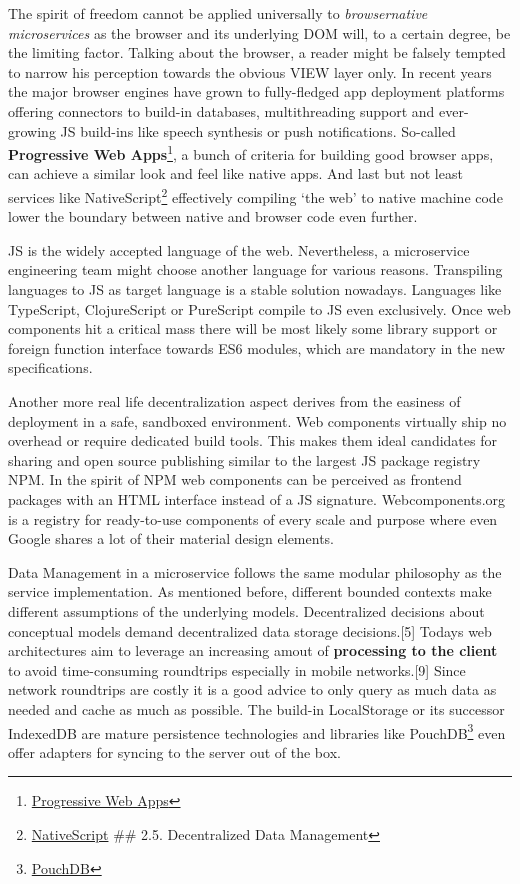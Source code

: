 \documentclass[]{article}
\begin{document}
The spirit of freedom cannot be applied universally to
\emph{browsernative microservices} as the browser and its underlying DOM
will, to a certain degree, be the limiting factor. Talking about the
browser, a reader might be falsely tempted to narrow his perception
towards the obvious VIEW layer only. In recent years the major browser
engines have grown to fully-fledged app deployment platforms offering
connectors to build-in databases, multithreading support and
ever-growing JS build-ins like speech synthesis or push notifications.
So-called \textbf{Progressive Web Apps}\footnote{\href{https://developers.google.com/web/progressive-web-apps}{Progressive
  Web Apps}}, a bunch of criteria for building good browser apps, can
achieve a similar look and feel like native apps. And last but not least
services like NativeScript\footnote{\href{https://www.nativescript.org}{NativeScript}
  \#\# 2.5. Decentralized Data Management} effectively compiling `the
web' to native machine code lower the boundary between native and
browser code even further.

JS is the widely accepted language of the web. Nevertheless, a
microservice engineering team might choose another language for various
reasons. Transpiling languages to JS as target language is a stable
solution nowadays. Languages like TypeScript, ClojureScript or
PureScript compile to JS even exclusively. Once web components hit a
critical mass there will be most likely some library support or foreign
function interface towards ES6 modules, which are mandatory in the new
specifications.

Another more real life decentralization aspect derives from the easiness
of deployment in a safe, sandboxed environment. Web components virtually
ship no overhead or require dedicated build tools. This makes them ideal
candidates for sharing and open source publishing similar to the largest
JS package registry NPM. In the spirit of NPM web components can be
perceived as frontend packages with an HTML interface instead of a JS
signature. Webcomponents.org is a registry for ready-to-use components
of every scale and purpose where even Google shares a lot of their
material design elements.

Data Management in a microservice follows the same modular philosophy as
the service implementation. As mentioned before, different bounded
contexts make different assumptions of the underlying models.
Decentralized decisions about conceptual models demand decentralized
data storage decisions.{[}5{]} Todays web architectures aim to leverage
an increasing amout of \textbf{processing to the client} to avoid
time-consuming roundtrips especially in mobile networks.{[}9{]} Since
network roundtrips are costly it is a good advice to only query as much
data as needed and cache as much as possible. The build-in LocalStorage
or its successor IndexedDB are mature persistence technologies and
libraries like PouchDB\footnote{\href{https://pouchdb.com/}{PouchDB}}
even offer adapters for syncing to the server out of the box.
\end{document}
